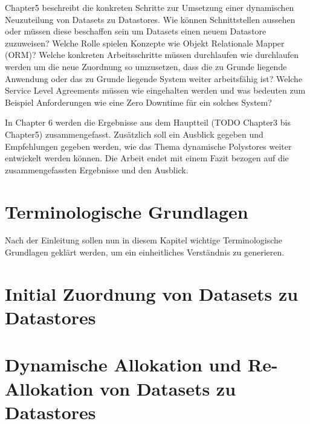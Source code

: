 Chapter5 beschreibt die konkreten Schritte zur Umsetzung einer dynamischen Neuzuteilung von Datasets
zu Datastores. Wie können Schnittstellen aussehen oder müssen diese beschaffen sein um Datasets 
einen neuem Datastore zuzuweisen? Welche Rolle spielen Konzepte wie Objekt Relationale Mapper (ORM)?
Welche konkreten Arbeitsschritte müssen durchlaufen wie durchlaufen werden um die neue Zuordnung
so umzusetzen, dass die zu Grunde liegende Anwendung oder das zu Grunde liegende System weiter 
arbeitsfähig ist? Welche Service Level Agreements müssen wie eingehalten werden und was bedeuten
zum Beispiel Anforderungen wie eine Zero Downtime für ein solches System?

In Chapter 6 werden die Ergebnisse aus dem Hauptteil (TODO Chapter3 bis Chapter5) zusammengefasst.
Zusätzlich soll ein Ausblick gegeben und Empfehlungen gegeben werden, wie das Thema dynamische 
Polystores weiter entwickelt werden können.
Die Arbeit endet mit einem Fazit bezogen auf die zusammengefassten Ergebnisse und den Ausblick.




\chapter{Terminologische Grundlagen}
Nach der Einleitung sollen nun in diesem Kapitel wichtige Terminologische Grundlagen geklärt werden,
um ein einheitliches Verständnis zu generieren.




\chapter{Initial Zuordnung von Datasets zu Datastores}



\chapter{Dynamische Allokation und Re-Allokation von Datasets zu Datastores}



